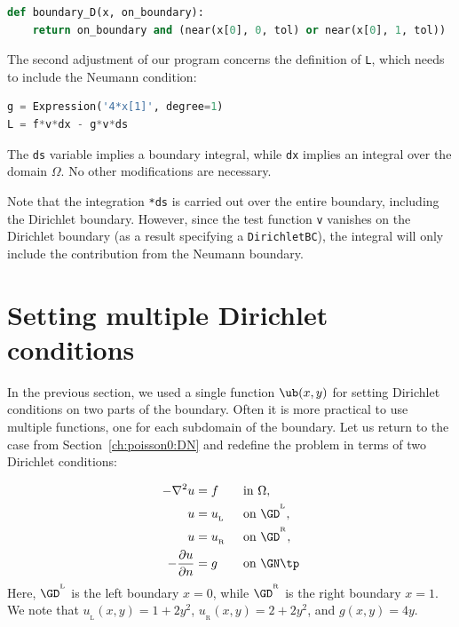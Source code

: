 \documentclass[graybox,envcountchap,sectrefs,final]{svmonodo}
\begin{document}
\begin{lstlisting}[language=Python,style=graycolor]
def boundary_D(x, on_boundary):
    return on_boundary and (near(x[0], 0, tol) or near(x[0], 1, tol))
\end{lstlisting}


The second adjustment of our program concerns the definition of \texttt{L},
which needs to include the Neumann condition:

\begin{lstlisting}[language=Python,style=graycolor]
g = Expression('4*x[1]', degree=1)
L = f*v*dx - g*v*ds
\end{lstlisting}
The \texttt{ds} variable implies a boundary integral, while \texttt{dx}
implies an integral over the domain $\Omega$.
No other modifications are necessary.

Note that the integration \texttt{*ds} is carried out over the entire
boundary, including the Dirichlet boundary. However, since the test
function \texttt{v} vanishes on the Dirichlet boundary (as a result
specifying a \texttt{DirichletBC}), the integral will only include the
contribution from the Neumann boundary.

\section{Setting multiple Dirichlet conditions}
\label{ch:poisson0:multiple:Dirichlet}

In the previous section, we used a single function $\ub(x,y)$ for
setting Dirichlet conditions on two parts of the boundary. Often it
is more practical to use multiple functions, one for each subdomain of the
boundary. Let us return to the case from Section~\ref{ch:poisson0:DN}
and redefine the problem in terms of two Dirichlet conditions:

\begin{alignat*}{2}
    - \nabla^2 u &= f \quad&&\mbox{in } \Omega, \\
    u &= u_{_\mathrm{L}} &&\mbox{on } \GD^{^{\mathrm{L}}}, \\
    u &= u_{_\mathrm{R}} &&\mbox{on } \GD^{^{\mathrm{R}}}, \\
    - {\partial u\over\partial n} &= g &&\mbox{on } \GN \tp
\end{alignat*}
Here, $\GD^{^{\mathrm{L}}}$ is the left boundary $x=0$, while
$\GD^{^{\mathrm{R}}}$ is the right boundary $x=1$. We note that
$u_{_\mathrm{L}}(x, y) = 1 + 2y^2$,
$u_{_\mathrm{R}}(x, y) = 2 + 2y^2$, and
$g(x, y)=4y$.
\end{document}
